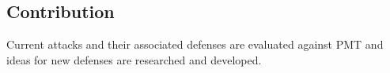 \subsection{Contribution}
Current attacks and their associated defenses are evaluated against \gls{PMT} and ideas for new defenses are researched and developed.